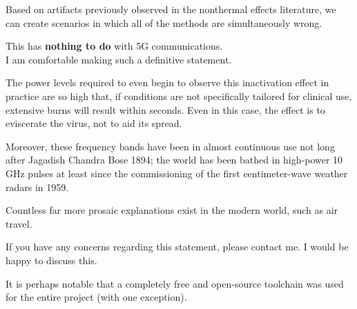 \documentclass[paper.tex]{subfiles}
\begin{document}
Based on artifacts previously observed in the nonthermal effects literature, we can create scenarios in which all of the methods are simultaneously wrong. 





\begin{autem}
	
	{\Large {This has \textbf{nothing to do} with 5G communications.}}\\
	
	I am comfortable making such a definitive statement.
	
	The power levels required to even begin to observe this inactivation effect in practice are so high that, if conditions are not specifically tailored for clinical use, extensive burns will result within seconds. Even in this case, the effect is to eviscerate the virus, not to aid its spread. 
	
	Moreover, these frequency bands have been in almost continuous use not long after Jagadish Chandra Bose 1894; the world has been bathed in high-power 10 GHz pulses at least since the commissioning of the first centimeter-wave weather radars in 1959. 
	
	Countless far more prosaic explanations exist in the modern world, such as air travel.
	
	If you have any concerns regarding this statement, please contact me. I would be happy to discuss this.
	
\end{autem}



%
%
%  
%

\tableofcontents


It is perhaps notable that a completely free and open-source toolchain was used for the entire project (with one exception).
\end{document}
